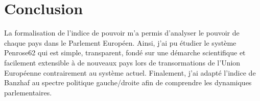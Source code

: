 

\section{Conclusion}

La formalisation de l'indice de pouvoir m'a permis d'analyser le pouvoir de chaque pays dans le Parlement Européen.
Ainsi, j'ai pu étudier le système Penrose62 qui est simple, transparent, fondé sur une démarche scientifique et facilement extensible à de nouveaux pays lors de transormations de l'Union Européenne contrairement au système actuel.
Finalement, j’ai adapté l’indice de Banzhaf au spectre politique gauche/droite afin de comprendre les dynamiques parlementaires.